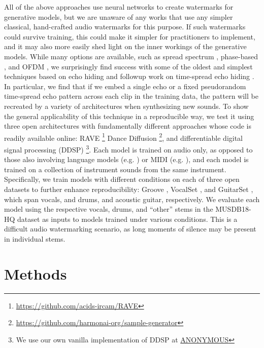 \documentclass[letterpaper]{article} %
\begin{document}
All of the above approaches use neural networks to create watermarks for generative models, but we are unaware of any works that use any simpler classical, hand-crafted audio watermarks for this purpose.  If such watermarks could survive training, this could make it simpler for practitioners to implement, and it may also more easily shed light on the inner workings of the generative models.  While many options are available, such as spread spectrum \cite{kirovski2001robust}, phase-based \cite{xiaoxiao_dong_data_2004, malik_robust_2007}, and OFDM \cite{eichelberger_receiving_2019}, we surprisingly find success with some of the oldest and simplest techniques based on echo hiding \cite{gruhl1996echo} and followup work on time-spread echo hiding \cite{ko2005time}.  In particular, we find that if we embed a single echo or a fixed pseudorandom time-spread echo pattern across each clip in the training data, the pattern will be recreated by a variety of architectures when synthesizing new sounds.  To show the general applicability of this technique in a reproducible way, we test it using three open architectures with fundamentally different approaches whose code is readily available online: RAVE \cite{caillon2021rave}\footnote{ \url{https://github.com/acids-ircam/RAVE} } Dance Diffusion \cite{evans2022dancediffusion} \footnote{ \url{https://github.com/harmonai-org/sample-generator} }, and differentiable digital signal processing (DDSP) \cite{engelddsp}\footnote{We use our own vanilla implementation of DDSP at \url{ANONYMOUS}}.  Each model is trained on audio only, as opposed to those also involving language models (e.g. \cite{evans2024fast}) or MIDI (e.g. \cite{hawthornemulti}), and each model is trained on a collection of instrument sounds from the same instrument.  Specifically, we train models with different conditions on each of three open datasets to further enhance reproducibility: Groove \cite{groove2019}, VocalSet \cite{wilkins2018vocalset}, and GuitarSet \cite{xi2018guitarset}, which span vocals, and drums, and acoustic guitar, respectively.  We evaluate each model using the respective vocals, drums, and ``other'' stems in the MUSDB18-HQ dataset \cite{musdb18-hq} as inputs to models trained under various conditions.  This is a difficult audio watermarking scenario, as long moments of silence may be present in individual stems.




\section{Methods}
\end{document}
